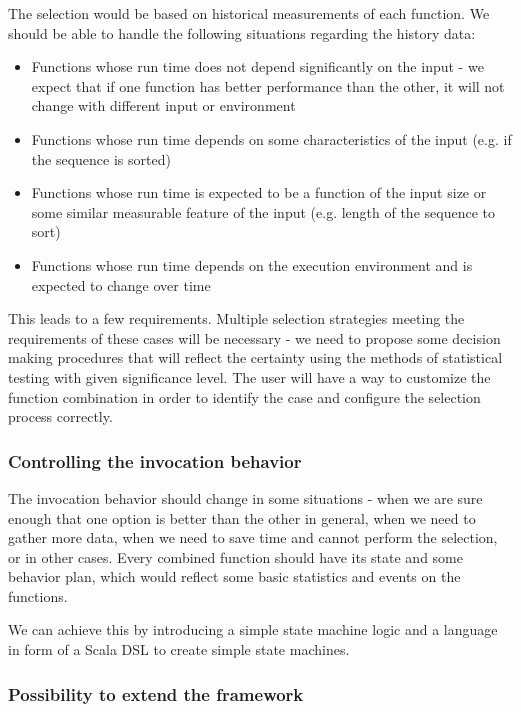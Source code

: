 The selection would be based on historical measurements of each function. We should be able to handle the following situations regarding the history data:

\begin{itemize}
	\item Functions whose run time does not depend significantly on the input - we expect that if one function has better performance than the other, it will not change with different input or environment
	\item Functions whose run time depends on some characteristics of the input (e.g. if the sequence is sorted)
	\item Functions whose run time is expected to be a function of the input size or some similar measurable feature of the input (e.g. length of the sequence to sort)
	\item Functions whose run time depends on the execution environment and is expected to change over time
\end{itemize}

This leads to a few requirements. Multiple selection strategies meeting the requirements of these cases will be necessary - we need to propose some decision making procedures that will reflect the certainty using the methods of statistical testing with given significance level. The user will have a way to customize the function combination in order to identify the case and configure the selection process correctly.

\subsubsection{Controlling the invocation behavior}

The invocation behavior should change in some situations - when we are sure enough that one option is better than the other in general, when we need to gather more data, when we need to save time and cannot perform the selection, or in other cases. Every combined function should have its state and some behavior plan, which would reflect some basic statistics and events on the functions.

We can achieve this by introducing a simple state machine logic and a language in form of a Scala DSL to create simple state machines.

\subsubsection{Possibility to extend the framework}

